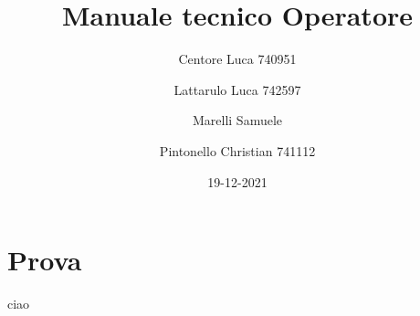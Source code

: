 \documentclass{article}
\title{Manuale tecnico Operatore}
\author{Centore Luca 740951 \and Lattarulo Luca 742597 \and Marelli Samuele \and Pintonello Christian 741112}
\date{19-12-2021}
\begin{document}
    \maketitle
    \section{Prova}\label{sec:prova}
    ciao
\end{document}
